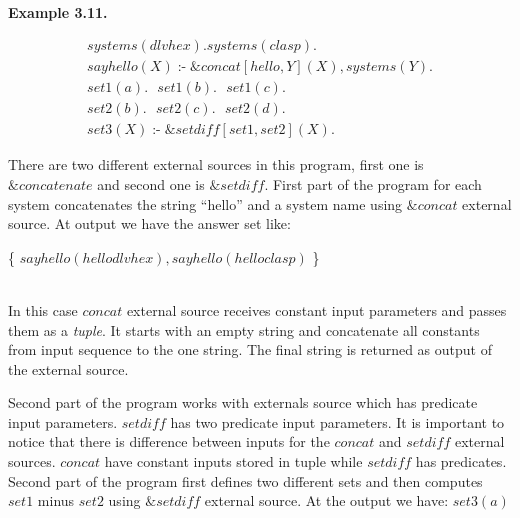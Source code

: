 \documentclass[14pt,a4paper, titlepage]{article}
\newcommand{\ext}[3]{\ensuremath{\&{#1}[#2](#3)}}
\DeclareMathOperator{\leftimpl}{:-}
\begin{document}
\textbf{\\Example 3.11.}

\begin{align*}
& \mathit{systems}(\mathit{dlvhex}). \mathit{systems}(\mathit{clasp}). \\  
& \mathit{sayhello(X)} \leftimpl \ext{\mathit{concat}}{\mathit{hello, Y}}{\mathit{X}}, \mathit{systems(Y).}  \\ 
& \mathit{set1}(a). \text{ } \mathit{set1}(b). \text{ } \mathit{set1}(c).\\
& \mathit{set2}(b). \text{ } \mathit{set2}(c). \text{ } \mathit{set2}(d).\\
& \mathit{set3}(X) \leftimpl \ext{\mathit{setdiff}}{\mathit{set1, set2}}{\mathit{X}}. 
&
\end{align*}

There are two different external sources in this program, first one is $\mathit{\&concatenate}$ and second one is $\mathit{\&setdiff}$. First part of the program for each system concatenates the string \enquote{hello} and a system name using $\mathit{\&concat}$ external source. At output we have the answer set like:\\ 
\centerline{ \{ $\mathit{sayhello}(\mathit{hellodlvhex}), \mathit{sayhello}(\mathit{helloclasp})$ \}}
\\In this case $\mathit{concat}$ external source receives constant input parameters and passes them as a \emph{tuple}. It starts with an empty string and concatenate all constants from input sequence to the one string. The final string is returned as output of the external source.   


Second part of the program works with externals source which has predicate input parameters. $\mathit{setdiff}$ has two predicate input parameters. It is important to notice that there is difference between inputs for the $\mathit{concat}$ and $\mathit{setdiff}$ external sources. $\mathit{concat}$ have constant inputs stored in tuple while $\mathit{setdiff}$ has predicates. Second part of the program first defines two different sets and then computes $\mathit{set1}$ minus $\mathit{set2}$ using $\mathit{\&setdiff}$ external source. At the output we have: $\mathit{set3}(a)$ 




\newpage
\end{document}

